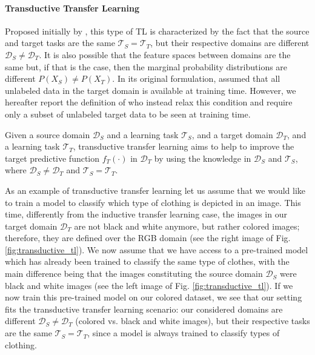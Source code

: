 \paragraph{Transductive Transfer Learning}
Proposed initially by \citet{arnold2007comparative}, this type of TL is characterized by the fact that the source and target tasks are the same $\mathcal{T}_S = \mathcal{T}_T$, but their respective domains are different $\mathcal{D}_S \neq \mathcal{D}_T$. It is also possible that the feature spaces between domains are the same but, if that is the case, then the marginal probability distributions are different $P(X_S)\neq P(X_T)$. In its original formulation, \citet{arnold2007comparative} assumed that all unlabeled data in the target domain is available at training time. However, we hereafter report the definition of \citet{pan2009survey} who instead relax this condition and require only a subset of unlabeled target data to be seen at training time.
\begin{definition}
	Given a source domain $\mathcal{D}_S$ and a learning task $\mathcal{T}_S$, and a target domain $\mathcal{D}_T$, and a learning task $\mathcal{T}_T$, transductive transfer learning aims to help to improve the target predictive function $f_T(\cdot)$ in $\mathcal{D}_T$ by using the knowledge in $\mathcal{D}_S$ and $\mathcal{T}_S$, where $\mathcal{D}_S \neq \mathcal{D}_T$ and $\mathcal{T}_S = \mathcal{T}_T$. 
\end{definition}
As an example of transductive transfer learning let us assume that we would like to train a model to classify which type of clothing is depicted in an image. This time, differently from the inductive transfer learning case, the images in our target domain $\mathcal{D}_T$ are not black and white anymore, but rather colored images; therefore, they are defined over the RGB domain (see the right image of Fig. \ref{fig:transductive_tl}). We now assume that we have access to a pre-trained model which has already been trained to classify the same type of clothes, with the main difference being that the images constituting the source domain $\mathcal{D}_S$ were black and white images (see the left image of Fig. \ref{fig:transductive_tl}). If we now train this pre-trained model on our colored dataset, we see that our setting fits the transductive transfer learning scenario: our considered domains are different $\mathcal{D}_S \neq \mathcal{D}_T$ (colored vs. black and white images), but their respective tasks are the same  $\mathcal{T}_S = \mathcal{T}_T$, since a model is always trained to classify types of clothing.

